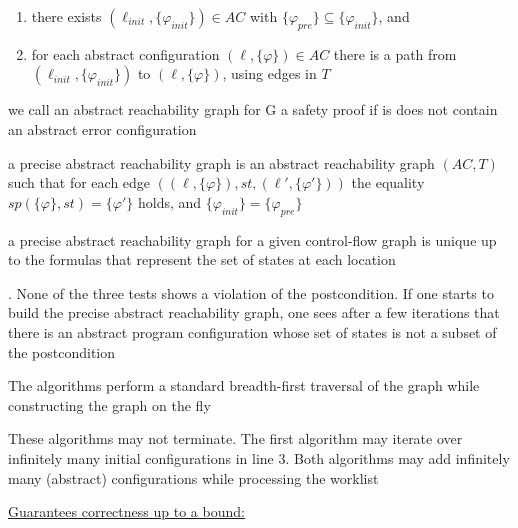 \documentclass[landscape, a4paper]{article}
\begin{document}
\begin{minipage}[t]{0.2\linewidth}
\begin{betterlist}
\begin{enumerate}
			\item there exists $(\ell_{init}, \{\varphi_{init}\}) \in AC$ with $\{\varphi_{pre}\} \subseteq \{\varphi_{init}\}$, and
			\item for each abstract configuration $(\ell, \{\varphi\}) \in AC$ there is a path from $(\ell_{init}, \{\varphi_{init}\})$ to $(\ell, \{\varphi\})$, using edges in $T$
		\end{enumerate}\color{black}
		\begin{betterlist}
			\item \color{orange}we call an abstract reachability graph for G a \alert{safety proof} if is does not contain an abstract error configuration\color{black}
			\begin{betterlist}
				\item {}
			\end{betterlist}
		\end{betterlist}
		\item \color{orange}a \alert{precise abstract reachability graph} is an abstract reachability graph $(AC, T)$ such that for each edge $((\ell, \{\varphi\}), st, (\ell', \{\varphi'\}))$ the equality $sp(\{\varphi\}, st) = \{\varphi'\}$ holds, and $\{\varphi_{init}\} = \{\varphi_{pre}\}$\color{black}
		\begin{betterlist}
			\item a precise abstract reachability graph for a given control-flow graph is unique up to the formulas that represent the set of states at each location
			\item {}. None of the three tests shows a violation of the postcondition. If one starts to build the precise abstract reachability graph, one sees after a few iterations that there is an abstract program configuration whose set of states is not a subset of the postcondition
			\item \script{363}{Algorithm}
			\item The algorithms perform a standard breadth-first traversal of the graph while constructing the graph on the fly
			\item These algorithms may not terminate. The first algorithm may iterate over infinitely many initial configurations in line 3. Both algorithms may add infinitely many (abstract) configurations while processing the worklist
			\item \script{364}{Modifications}
			\item \underline{Guarantees correctness up to a bound:}

\end{betterlist}
\end{betterlist}
\end{minipage}
\end{document}
